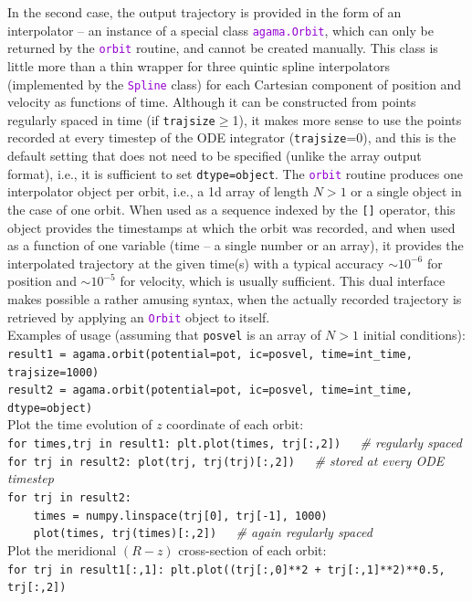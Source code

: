 \documentclass[12pt]{article}
\newcommand{\ttt}[1]{\textcolor{darkviolet}{\texttt{#1}}}
\newcommand{\ppp}[1]{\textcolor{darkolive} {\texttt{#1}}}
\begin{document}
In the second case, the output trajectory is provided in the form of an interpolator -- an instance of a special class \ttt{agama.Orbit}, which can only be returned by the \ttt{orbit} routine, and cannot be created manually. This class is little more than a thin wrapper for three quintic spline interpolators (implemented by the \ttt{Spline} class) for each Cartesian component of position and velocity as functions of time. Although it can be constructed from points regularly spaced in time (if \ppp{trajsize}$\ge$1), it makes more sense to use the points recorded at every timestep of the ODE integrator (\ppp{trajsize}=0), and this is the default setting that does not need to be specified (unlike the array output format), i.e., it is sufficient to set \ppp{dtype}\texttt{=object}. The \ttt{orbit} routine produces one interpolator object per orbit, i.e., a 1d array of length $N>1$ or a single object in the case of one orbit. When used as a sequence indexed by the \texttt{[]} operator, this object provides the timestamps at which the orbit was recorded, and when used as a function of one variable (time -- a single number or an array), it provides the interpolated trajectory at the given time(s) with a typical accuracy $\sim10^{-6}$ for position and $\sim10^{-5}$ for velocity, which is usually sufficient. This dual interface makes possible a rather amusing syntax, when the actually recorded trajectory is retrieved by applying an \ttt{Orbit} object to itself.\\[1mm]
Examples of usage (assuming that \texttt{posvel} is an array of $N>1$ initial conditions):\\[1mm]
\texttt{result1 = agama.orbit(potential=pot, ic=posvel, time=int_time, trajsize=1000)}\\
\texttt{result2 = agama.orbit(potential=pot, ic=posvel, time=int_time, dtype=object)}\\[1mm]
Plot the time evolution of $z$ coordinate of each orbit:\\[1mm]
\texttt{for times,trj in result1: plt.plot(times, trj[:,2])\ \ \ }\textit{\color{Sepia}\# regularly spaced} \\
\texttt{for trj in result2: plot(trj, trj(trj)[:,2])\ \ \ }\textit{\color{Sepia}\# stored at every ODE timestep}\\
\texttt{for trj in result2:\\
\mbox{}~~~~times = numpy.linspace(trj[0], trj[-1], 1000)\\
\mbox{}~~~~plot(times, trj(times)[:,2])\ \ \ }\textit{\color{Sepia}\# again regularly spaced} \\[1mm]
Plot the meridional $(R-z)$ cross-section of each orbit:\\[1mm]
\texttt{for trj in result1[:,1]: plt.plot((trj[:,0]**2 + trj[:,1]**2)**0.5, trj[:,2])}
\end{document}
